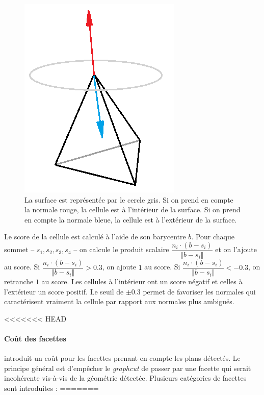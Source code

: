﻿\documentclass[12pt, twoside]{article}
\begin{document}
\begin{figure}[h]
\centering
\includegraphics[scale=0.4]{InOut.png}
\caption{\label{fig:inout} La surface est représentée par le cercle gris. Si on prend en compte la normale rouge, la cellule est à l'intérieur de la surface. Si on prend en compte la normale bleue, la cellule est à l'extérieur de la surface.}
\end{figure}

Le score de la cellule est calculé à l'aide de son barycentre $b$. Pour chaque sommet -- $s_1, s_2, s_3, s_4$ -- on calcule le produit scalaire $\dfrac{n_i\cdot(b-s_i)}{\Vert b-s_i\Vert}$ et on l'ajoute au score. Si $\dfrac{n_i\cdot(b-s_i)}{\Vert b-s_i\Vert} > 0.3$, on ajoute $1$ au score. Si $\dfrac{n_i\cdot(b-s_i)}{\Vert b-s_i\Vert} < -0.3$, on retranche $1$ au score. Les cellules à l'intérieur ont un score négatif et celles à l'extérieur un score positif. Le seuil de $\pm 0.3$ permet de favoriser les normales qui caractérisent vraiment la cellule par rapport aux normales plus ambiguës.

<<<<<<< HEAD
\paragraph{Coût des facettes} \cite{maillage2} introduit un coût pour les facettes prenant en compte les plans détectés. Le principe général est d'empêcher le \textit{graphcut} de passer par une facette qui serait incohérente vis-à-vis de la géométrie détectée. Plusieurs catégories de facettes sont introduites :
=======
\end{document}
